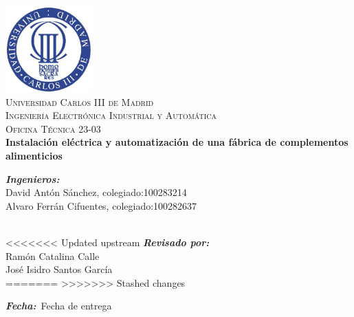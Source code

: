 \begin{titlepage}

\begin{center}


\includegraphics[width=0.25\textwidth]{./uc3m.jpg}\\[2cm]    
\textsc{\huge Universidad Carlos III de Madrid}\\[0.5cm]
\textsc{\LARGE Ingeniería Electrónica Industrial y Automática}\\[0.5cm]
\textsc{\Large Oficina Técnica 23-03}\\[4cm]

{\LARGE \bfseries{Instalación eléctrica y automatización de una fábrica de complementos alimenticios}\\[4.5cm]}


\end{center}
\setlength{\parindent}{0cm}


\vspace{10pt}
\emph{\bfseries{Ingenieros:}}\\
David Antón Sánchez, colegiado:100283214\\
Alvaro Ferrán Cifuentes, colegiado:100282637\\\




<<<<<<< Updated upstream
\emph{\bfseries{Revisado por:}}\\
Ramón Catalina Calle\\
José Isidro Santos García\\


=======
>>>>>>> Stashed changes

\emph{\bfseries{Fecha:}}\ Fecha de entrega\\












\end{titlepage}